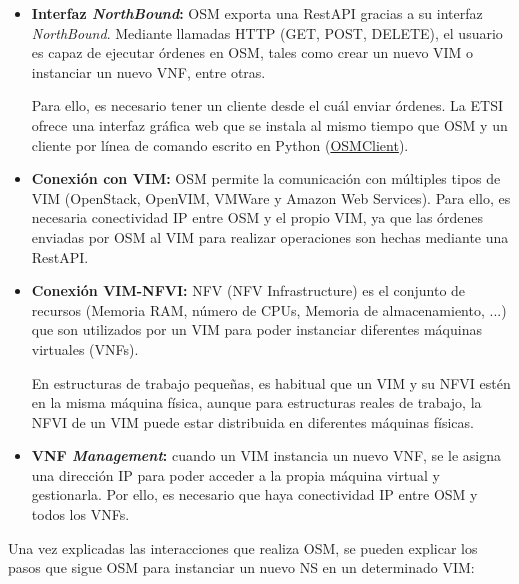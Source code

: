 \begin{itemize}
	\item \textbf{Interfaz \textit{NorthBound}:} OSM exporta una RestAPI gracias a su interfaz \textit{NorthBound}. Mediante llamadas HTTP (GET, POST, DELETE), el usuario es capaz de ejecutar órdenes en OSM, tales como crear un nuevo VIM o instanciar un nuevo VNF, entre otras.
	
	Para ello, es necesario tener un cliente desde el cuál enviar órdenes. La ETSI ofrece una interfaz gráfica web que se instala al mismo tiempo que OSM y un cliente por línea de comando escrito en Python (\href{https://osm.etsi.org/wikipub/index.php/OsmClient}{OSMClient}).
	
	\item \textbf{Conexión con VIM:} OSM permite la comunicación con múltiples tipos de VIM (OpenStack, OpenVIM, VMWare y Amazon Web Services). Para ello, es necesaria conectividad IP entre OSM y el propio VIM, ya que las órdenes enviadas por OSM al VIM para realizar operaciones son hechas mediante una RestAPI.
	
	\item \textbf{Conexión VIM-NFVI:} NFV (NFV Infrastructure) es el conjunto de recursos (Memoria RAM, número de CPUs, Memoria de almacenamiento, ...) que son utilizados por un VIM para poder instanciar diferentes máquinas virtuales (VNFs). 
	
	En estructuras de trabajo pequeñas, es habitual que un VIM y su NFVI estén en la misma máquina física, aunque para estructuras reales de trabajo, la NFVI de un VIM puede estar distribuida en diferentes máquinas físicas.
	
	\item \textbf{VNF \textit{Management}:} cuando un VIM instancia un nuevo VNF, se le asigna una dirección IP para poder acceder a la propia máquina virtual y gestionarla. Por ello, es necesario que haya conectividad IP entre OSM y todos los VNFs. 
\end{itemize}

\clearpage

Una vez explicadas las interacciones que realiza OSM, se pueden explicar los pasos que sigue OSM para instanciar un nuevo NS en un determinado VIM:

